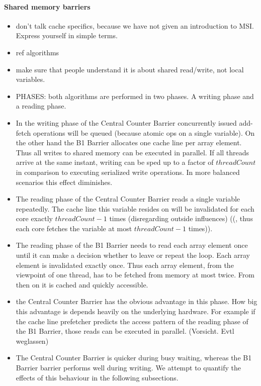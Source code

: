 \documentclass[a4paper, 10pt]{article}
\begin{document}
\paragraph{Shared memory barriers}
\label{sssec:analysis-general-shared}
\begin{itemize}
	\item don't talk cache specifics, because we have not given an introduction to MSI. Express yourself in simple terms.
	\item ref algorithms
	\item make sure that people understand it is about shared read/write, not local variables.
	\item PHASES: both algorithms are performed in two phases. A writing phase and a reading phase.
	\item In the writing phase of the Central Counter Barrier concurrently issued add-fetch operations will be queued (because atomic ops on a single variable). On the other hand the B1 Barrier allocates one cache line per array element. Thus all writes to shared memory can be executed in parallel. If all threads arrive at the same instant, writing can be sped up to a factor of $\mathit{threadCount}$ in comparison to executing serialized write operations. In more balanced scenarios this effect diminishes.
	\item The reading phase of the Central Counter Barrier reads a single variable repeatedly. The cache line this variable resides on will be invalidated for each core exactly $\mathit{threadCount} - 1$ times (disregarding outside influences) ((, thus each core fetches the variable at most $\mathit{threadCount} - 1$ times)).
	\item The reading phase of the B1 Barrier needs to read each array element once until it can make a decision whether to leave or repeat the loop. Each array element is invalidated exactly once. Thus each array element, from the viewpoint of one thread, has to be fetched from memory at most twice. From then on it is cached and quickly accessible.
	\item the Central Counter Barrier has the obvious advantage in this phase. How big this advantage is depends heavily on the underlying hardware. For example if the cache line prefetcher predicts the access pattern of the reading phase of the B1 Barrier, those reads can be executed in parallel. (Vorsicht. Evtl weglassen)
	\item The Central Counter Barrier is quicker during busy waiting, whereas the B1 Barrier barrier performs well during writing. We attempt to quantify the effects of this behaviour in the following subsections.

\end{itemize}
\end{document}
